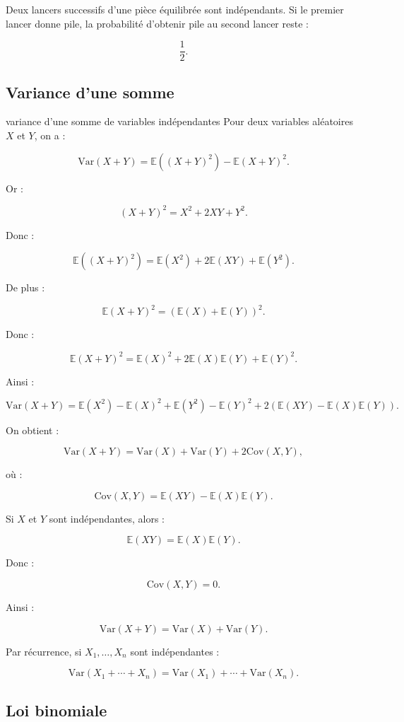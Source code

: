 \documentclass[11pt,a4paper]{article}
\newcommand{\E}{\mathbb{E}}
\newcommand{\V}{\mathrm{Var}}
\begin{document}
\begin{exemple}
Deux lancers successifs d'une pièce équilibrée sont indépendants. Si le premier lancer donne pile, la probabilité d'obtenir pile au second lancer reste :

\[
\frac12.
\]
\end{exemple}

\subsection{Variance d'une somme}

\begin{preuve}{variance d'une somme de variables indépendantes}
Pour deux variables aléatoires $X$ et $Y$, on a :

\[
\V(X+Y)=\E((X+Y)^2)-\E(X+Y)^2.
\]

Or :

\[
(X+Y)^2=X^2+2XY+Y^2.
\]

Donc :

\[
\E((X+Y)^2)=\E(X^2)+2\E(XY)+\E(Y^2).
\]

De plus :

\[
\E(X+Y)^2=(\E(X)+\E(Y))^2.
\]

Donc :

\[
\E(X+Y)^2=\E(X)^2+2\E(X)\E(Y)+\E(Y)^2.
\]

Ainsi :

\[
\V(X+Y)
=
\E(X^2)-\E(X)^2
+
\E(Y^2)-\E(Y)^2
+
2(\E(XY)-\E(X)\E(Y)).
\]

On obtient :

\[
\V(X+Y)=\V(X)+\V(Y)+2\mathrm{Cov}(X,Y),
\]

où :

\[
\mathrm{Cov}(X,Y)=\E(XY)-\E(X)\E(Y).
\]

Si $X$ et $Y$ sont indépendantes, alors :

\[
\E(XY)=\E(X)\E(Y).
\]

Donc :

\[
\mathrm{Cov}(X,Y)=0.
\]

Ainsi :

\[
\V(X+Y)=\V(X)+\V(Y).
\]

Par récurrence, si $X_1,\dots,X_n$ sont indépendantes :

\[
\V(X_1+\cdots+X_n)=\V(X_1)+\cdots+\V(X_n).
\]
\end{preuve}

\subsection{Loi binomiale}
\end{document}
